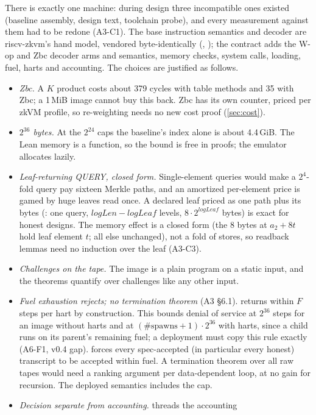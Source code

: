\noindent There is exactly one machine: during design three incompatible ones existed (baseline
assembly, design text, toolchain probe), and every measurement against them had to be redone
(A3-C1). The base instruction semantics and decoder are riscv-zkvm's hand model, vendored
byte-identically (, ); the contract adds the W-op and Zbc decoder arms
and semantics, memory checks, system calls, loading, fuel, harts and accounting. The choices are
justified as follows.
\begin{itemize}[nosep]
\item \emph{Zbc.} A $K$ product costs about 379 cycles with table methods and 35 with Zbc; a 1\,MiB
  image cannot buy this back. Zbc has its own counter, priced per zkVM profile, so re-weighting
  needs no new cost proof (\cref{sec:cost}).
\item \emph{$2^{36}$ bytes.} At the $2^{24}$ caps the baseline's index alone is about 4.4\,GiB. The
  Lean memory is a function, so the bound is free in proofs; the emulator allocates lazily.
\item \emph{Leaf-returning QUERY, closed form.} Single-element queries would make a $2^4$-fold query
  pay sixteen Merkle paths, and an amortized per-element price is gamed by huge leaves read once.
  A declared leaf priced as one path plus its bytes (: one query,
  $\mathit{logLen}-\mathit{logLeaf}$ levels, $8\cdot2^{\mathit{logLeaf}}$ bytes) is exact for honest
  designs. The memory effect is a closed form (the 8 bytes at $a_2+8t$ hold leaf element $t$; all
  else unchanged), not a fold of stores, so readback lemmas need no induction over the leaf (A3-C3).
\item \emph{Challenges on the tape.} The image is a plain program on a static input, and the
  theorems quantify over challenges like any other input.
\item \emph{Fuel exhaustion rejects; no termination theorem} (A3 §6.1).  returns
  within $F$ steps per hart by construction. This bounds denial of service at $2^{36}$ steps for an
  image without harts and at $(\#\mathrm{spawns}+1)\cdot2^{36}$ with harts, since a child runs on its
  parent's remaining fuel; a deployment must copy this rule exactly (A6-F1, v0.4 gap).  forces every spec-accepted (in particular every honest) transcript to be accepted
  within fuel. A termination theorem over all raw tapes would need a ranking argument per
  data-dependent loop, at no gain for recursion. The deployed semantics includes the cap.
\item \emph{Decision separate from accounting.}  threads the accounting 

\end{itemize}

